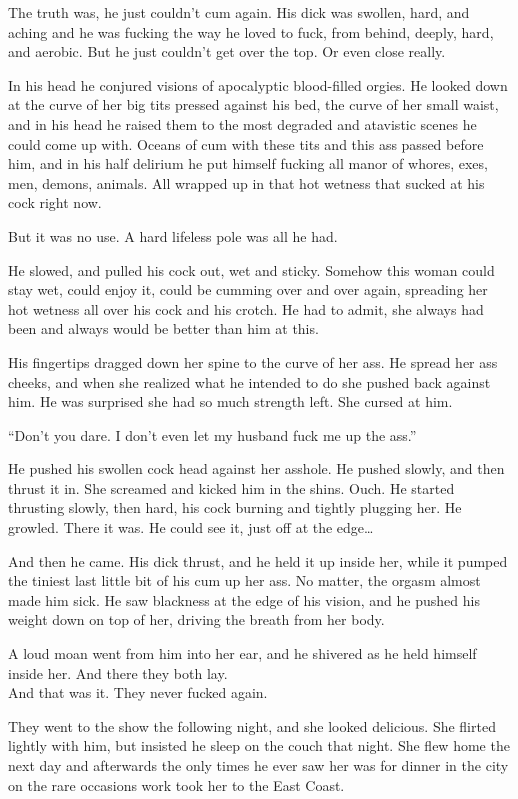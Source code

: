 \documentclass[letterpaper]{article}
\begin{document}
The truth was, he just couldn't cum again. His dick was swollen, hard, and aching and he was fucking the way he loved to fuck, from behind, deeply, hard, and aerobic. 
But he just couldn't get over the top. Or even close really.

In his head he conjured visions of apocalyptic blood-filled orgies. 
He looked down at the curve of her big tits pressed against his bed, the curve of her small waist, and in his head he raised them to the most degraded and atavistic scenes he could come up with. 
Oceans of cum with these tits and this ass passed before him, and in his half delirium he put himself fucking all manor of whores, exes, men, demons, animals.
All wrapped up in that hot wetness that sucked at his cock right now.

But it was no use. A hard lifeless pole was all he had.

He slowed, and pulled his cock out, wet and sticky. Somehow this woman could stay wet, could enjoy it, could be cumming over and over again, spreading her hot wetness all over his cock and his crotch.
He had to admit, she always had been and always would be better than him at this.

His fingertips dragged down her spine to the curve of her ass.
He spread her ass cheeks, and when she realized what he intended to do she pushed back against him.
He was surprised she had so much strength left.
She cursed at him.

``Don't you dare. I don't even let my husband fuck me up the ass.''

He pushed his swollen cock head against her asshole. He pushed slowly, and then thrust it in.
She screamed and kicked him in the shins. Ouch.
He started thrusting slowly, then hard, his cock burning and tightly plugging her.
He growled. There it was. He could see it, just off at the edge\ldots

And then he came. His dick thrust, and he held it up inside her, while it pumped the tiniest last little bit of his cum up her ass.
No matter, the orgasm almost made him sick. He saw blackness at the edge of his vision, and he pushed his weight down on top of her, driving the breath from her body.

A loud moan went from him into her ear, and he shivered as he held himself inside her. And there they both lay.\\

And that was it.
They never fucked again. 

They went to the show the following night, and she looked delicious. 
She flirted lightly with him, but insisted he sleep on the couch that night. 
She flew home the next day and afterwards the only times he ever saw her was for dinner in the city on the rare occasions work took her to the East Coast.
\end{document}
